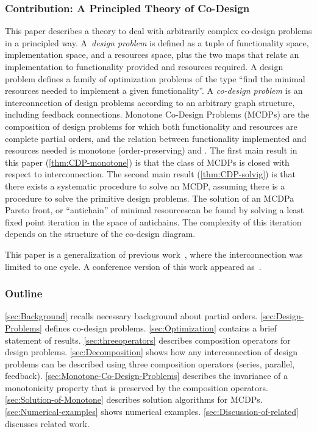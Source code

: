 \subsubsection{Contribution: A Principled Theory of Co-Design}

This paper describes a theory to deal with arbitrarily complex co-design
problems in a principled way. A~\emph{design problem} is defined
as a tuple of functionality space, implementation space, and a resources
space, plus the two maps that relate an implementation to functionality
provided and resources required. A design problem defines a family
of optimization problems of the type ``find the minimal resources
needed to implement a given functionality''. A \emph{co-design problem}
is an interconnection of design problems according to an arbitrary
graph structure, including feedback connections. Monotone Co-Design
Problems (MCDPs) are the composition of design problems for which
both functionality and resources are complete partial orders, and
the relation between functionality implemented and resources needed
is monotone (order-preserving) and \scottcontinuous. The first main
result in this paper (\cref{thm:CDP-monotone}) is that the
class of MCDPs is closed with respect to interconnection. The second
main result (\cref{thm:CDP-solvig}) is that there exists
a systematic procedure to solve an MCDP, assuming there is a procedure
to solve the primitive design problems. The solution of an MCDP\textemdash a
Pareto front, or ``antichain'' of minimal resources\textemdash can
be found by solving a least fixed point iteration in the space of
antichains. The complexity of this iteration depends on the structure
of the co-design diagram.

This paper is a generalization of previous work~\cite{censi15monotone},
where the interconnection was limited to one cycle. A conference
version of this work appeared as~\cite{censi15same}.



\subsubsection{Outline}

\cref{sec:Background} recalls necessary background about partial orders.
\cref{sec:Design-Problems} defines co-design problems. \cref{sec:Optimization}
contains a brief statement of results. \cref{sec:threeoperators} describes
composition operators for design problems. \cref{sec:Decomposition}
shows how any interconnection of design problems can be described
using three composition operators (series, parallel, feedback). \cref{sec:Monotone-Co-Design-Problems}
describes the invariance of a monotonicity property that is preserved
by the composition operators. \cref{sec:Solution-of-Monotone} describes
solution algorithms for MCDPs. \cref{sec:Numerical-examples} shows
numerical examples. \cref{sec:Discussion-of-related} discusses related
work.



